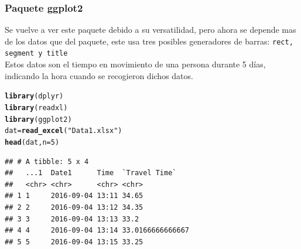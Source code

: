 \documentclass{article}\usepackage[]{graphicx}\usepackage[]{color}
\makeatletter
\newcommand{\hlnum}[1]{\textcolor[rgb]{0.686,0.059,0.569}{#1}}%
\newcommand{\hlstr}[1]{\textcolor[rgb]{0.192,0.494,0.8}{#1}}%
\newcommand{\hlstd}[1]{\textcolor[rgb]{0.345,0.345,0.345}{#1}}%
\newcommand{\hlkwb}[1]{\textcolor[rgb]{0.69,0.353,0.396}{#1}}%
\newcommand{\hlkwc}[1]{\textcolor[rgb]{0.333,0.667,0.333}{#1}}%
\newcommand{\hlkwd}[1]{\textcolor[rgb]{0.737,0.353,0.396}{\textbf{#1}}}%
\newenvironment{kframe}{%
 \def\at@end@of@kframe{}%
 \ifinner\ifhmode%
  \def\at@end@of@kframe{\end{minipage}}%
  \begin{minipage}{\columnwidth}%
 \fi\fi%
 \def\FrameCommand##1{\hskip\@totalleftmargin \hskip-\fboxsep
 \colorbox{shadecolor}{##1}\hskip-\fboxsep
     \hskip-\linewidth \hskip-\@totalleftmargin \hskip\columnwidth}%
 \MakeFramed {\advance\hsize-\width
   \@totalleftmargin\z@ \linewidth\hsize
   \@setminipage}}%
 {\par\unskip\endMakeFramed%
 \at@end@of@kframe}
\newenvironment{knitrout}{}{} %
\makeatother
\begin{document}
\subsubsection{Paquete ggplot2}
Se vuelve a ver este paquete%
debido a su versatilidad, pero ahora se depende mas de los datos que del paquete, este usa tres posibles generadores de barras: \texttt{rect, segment y title}~\\
Estos datos son el tiempo en movimiento de una persona durante 5 d\'ias, indicando la hora cuando se recogieron dichos datos.
\begin{knitrout}
\color{fgcolor}\begin{kframe}
\begin{alltt}
\hlkwd{library}\hlstd{(dplyr)}
\hlkwd{library}\hlstd{(readxl)}
\hlkwd{library}\hlstd{(ggplot2)}
\hlstd{dat} \hlkwb{=} \hlkwd{read_excel}\hlstd{(}\hlstr{"Data1.xlsx"}\hlstd{)}
\hlkwd{head}\hlstd{(dat,} \hlkwc{n}\hlstd{=}\hlnum{5}\hlstd{)}
\end{alltt}
\begin{verbatim}
## # A tibble: 5 x 4
##   ...1  Date1      Time  `Travel Time`   
##   <chr> <chr>      <chr> <chr>           
## 1 1     2016-09-04 13:11 34.65           
## 2 2     2016-09-04 13:12 34.35           
## 3 3     2016-09-04 13:13 33.2            
## 4 4     2016-09-04 13:14 33.0166666666667
## 5 5     2016-09-04 13:15 33.25
\end{verbatim}
\end{kframe}
\end{knitrout}
\end{document}
